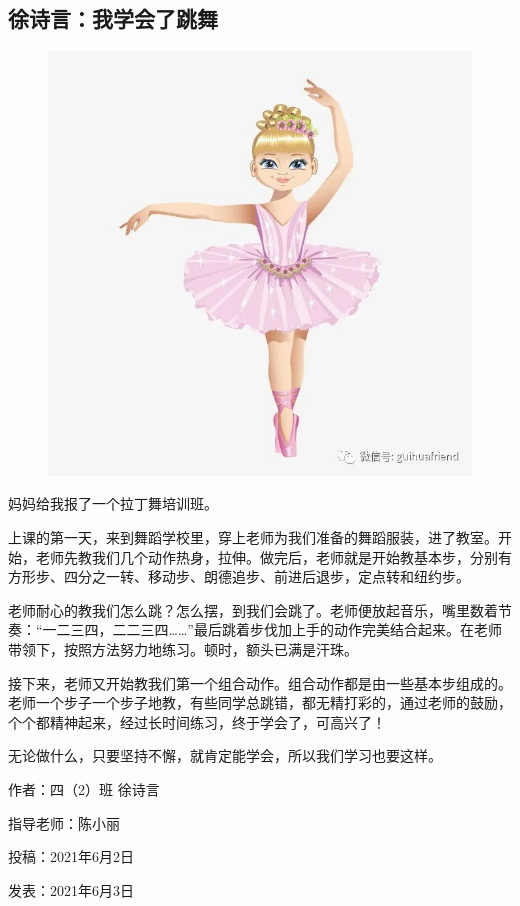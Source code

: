 \vspace{10pt}

{\centering\subsection*{徐诗言：我学会了跳舞}}


\renewcommand{\leftmark}{徐诗言：我学会了跳舞}

\begin{figure}[htbp]

\centering

\includegraphics[width = .5\textwidth]{./ch/11.jpg}

\end{figure}



妈妈给我报了一个拉丁舞培训班。

上课的第一天，来到舞蹈学校里，穿上老师为我们准备的舞蹈服装，进了教室。开始，老师先教我们几个动作热身，拉伸。做完后，老师就是开始教基本步，分别有方形步、四分之一转、移动步、朗德追步、前进后退步，定点转和纽约步。

老师耐心的教我们怎么跳？怎么摆，到我们会跳了。老师便放起音乐，嘴里数着节奏：“一二三四，二二三四……”最后跳着步伐加上手的动作完美结合起来。在老师带领下，按照方法努力地练习。顿时，额头已满是汗珠。

接下来，老师又开始教我们第一个组合动作。组合动作都是由一些基本步组成的。老师一个步子一个步子地教，有些同学总跳错，都无精打彩的，通过老师的鼓励，个个都精神起来，经过长时间练习，终于学会了，可高兴了！

无论做什么，只要坚持不懈，就肯定能学会，所以我们学习也要这样。





\vspace{10pt}



作者：四（2）班 徐诗言



指导老师：陈小丽



投稿：2021年6月2日



发表：2021年6月3日








                



\vspace{10pt}

\hline



